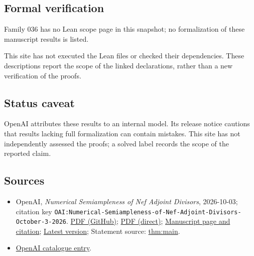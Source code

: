 \documentclass[11pt]{article}
\begin{document}
\subsection{Formal verification}
Family 036 has no Lean scope page in this snapshot; no formalization of these manuscript results is listed.

This site has not executed the Lean files or checked their dependencies. These descriptions report the scope of the linked declarations, rather than a new verification of the proofs.

\subsection{Status caveat}
OpenAI attributes these results to an internal model. Its release notice cautions that results lacking full formalization can contain mistakes. This site has not independently assessed the proofs; a solved label records the scope of the reported claim.

\subsection{Sources}
\begin{itemize}
\item OpenAI, \emph{Numerical Semiampleness of Nef Adjoint Divisors}, 2026-10-03; citation key \texttt{OAI:Numerical-Semiampleness-of-Nef-Adjoint-Divisors-October-3-2026}. \href{https://github.com/openai/math/blob/adc7f1241b42e322a6451854ab7e4b4c146bf78a/preprints/Numerical-Semiampleness-of-Nef-Adjoint-Divisors-October-3-2026/paper.pdf}{PDF (GitHub)}; \href{https://github.com/openai/math/raw/adc7f1241b42e322a6451854ab7e4b4c146bf78a/preprints/Numerical-Semiampleness-of-Nef-Adjoint-Divisors-October-3-2026/paper.pdf}{PDF (direct)}; \href{https://github.com/openai/math/blob/adc7f1241b42e322a6451854ab7e4b4c146bf78a/preprints/Numerical-Semiampleness-of-Nef-Adjoint-Divisors-October-3-2026/README.md}{Manuscript page and citation}; \href{https://github.com/openai/math/blob/main/preprints/Numerical-Semiampleness-of-Nef-Adjoint-Divisors-October-3-2026/paper.pdf}{Latest version}; Statement source: \href{https://github.com/openai/math/blob/adc7f1241b42e322a6451854ab7e4b4c146bf78a/preprints/Numerical-Semiampleness-of-Nef-Adjoint-Divisors-October-3-2026/build/sections/introduction.tex\#L18}{thm:main}.
\item \href{https://github.com/openai/math/blob/adc7f1241b42e322a6451854ab7e4b4c146bf78a/CONTENTS.md}{OpenAI catalogue entry}.
\end{itemize}
\end{document}
